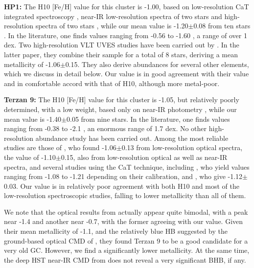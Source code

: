 \documentclass[onecolumn]{aa}
\begin{document}
{\bf HP1:}
The H10 [Fe/H] value for this cluster is -1.00, based on low-resolution CaT integrated spectroscopy \citep{Armandroff1988},  near-IR low-resolution spectra of two stars \citep{Stephens2004} and high-resolution spectra of two stars \citep{Barbuy2006}, while our mean value is -1.20$\pm$0.08 from ten stars \citep[][give -1.14 from 12 stars]{Horta2020}. In the literature, one  finds values ranging from -0.56 \citep{Minniti1995b} to -1.60 \citep{Davidge2000}, a range of over 1 dex. Two high-resolution VLT UVES
studies have been carried out by \citet{Barbuy2006, Barbuy2016}. In the latter paper, they combine their sample for a total of 8 stars, deriving a mean metallicity of -1.06$\pm$0.15.
They also derive abundances for several other elements, which we discuss in detail below.
Our value is in good agreement with their value and in comfortable accord with that of H10, although more metal-poor.

{\bf Terzan 9:}
The H10 [Fe/H] value for this cluster is -1.05, but relatively poorly determined, with a low weight, based only on near-IR photometry \citep{Valenti2010}, while our mean value is -1.40$\pm$0.05 from nine stars. In the literature, one finds values ranging from -0.38 \citep{Zinn1985} to -2.1 \citep{Ortolani1999}, an enormous range of 1.7 dex. No other high-resolution abundance study has been carried out. Among the most reliable studies are those of  \citet{Dias2016}, who found -1.06$\pm$0.13 from low-resolution optical spectra, the \citet{Ernandes2019} value of -1.10$\pm$0.15, also from low-resolution optical as well as near-IR spectra, and several studies using the CaT technique,
including \cite{Vasquez2018}, who yield values ranging from -1.08 to -1.21 depending on their calibration, and 
\citet{Geisler2021}, who give -1.12$\pm$0.03.
Our value is in relatively poor  agreement with both H10 
and most of the low-resolution spectroscopic studies, falling to lower metallicity than all of them.

We note that the optical results from \citet{Ernandes2019} actually appear quite bimodal, with a peak near -1.4 and another near -0.7, with the former agreeing with our value. Given their mean metallicity of -1.1, and the relatively blue HB suggested by the ground-based optical CMD of \citet{Ortolani1999}, they found Terzan 9 to be a good candidate for a very old GC. However, we find a significantly lower metallicity. At the same time, the deep HST near-IR CMD from \citet{Cohen2018} does not reveal a very significant BHB, if any.
\end{document}
